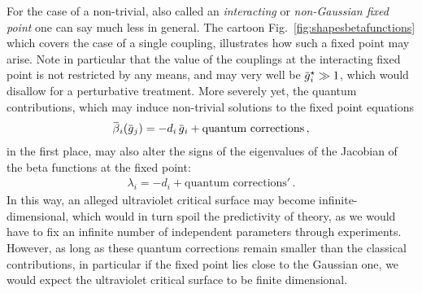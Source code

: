 \documentclass[11pt]{book}
\newcommand{\overbar}[1]{\mkern 1.5mu\overline{\mkern-1.5mu#1\mkern-1.5mu}\mkern 1.5mu}
\numberwithin{equation}{chapter}
\begin{document}
For the case of a non-trivial, also called
an \textit{interacting} or \textit{non-Gaussian fixed point}
one can say much less in general.
The cartoon Fig.~\ref{fig:shapesbetafunctions} which
covers the case of a single coupling,
illustrates how such a fixed point may arise.
Note in particular
that the value of the couplings at the
interacting fixed point
is not restricted by any means, and may very well
be $\overbar g_i^\star \gg 1$,
which would disallow for a perturbative treatment.
More severely yet, the quantum contributions,
which may induce non-trivial solutions to the fixed point
equations
\begin{align}
  \overbar \beta_i(\overbar g_j) =
  - d_i \, \overbar g_i +
  \text{quantum corrections} \,,
\end{align}
in the first place,
may also alter the signs of the eigenvalues of the Jacobian
of the beta functions at the fixed point:
\begin{align}
  \lambda_i =
  - d_i +
  \text{quantum corrections}' \,.
\end{align}
In this way,
an alleged ultraviolet critical surface
may become infinite-dimensional, which would in turn spoil
the predictivity of theory, as we would have to fix
an infinite number of independent parameters through
experiments.
However, as long as these quantum corrections remain smaller
than the classical contributions, in particular
if the fixed point lies close to the Gaussian one, we
would expect the ultraviolet critical surface to be finite
dimensional.
\end{document}
